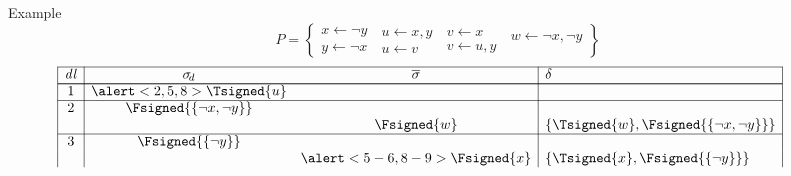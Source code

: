 \begin{frame}[shrink=0]{Example}
  \[
    P
    =
    \left\{
    \begin{array}{l}
      x  \leftarrow  \neg y \\
      y  \leftarrow  \neg x
    \end{array}
    \
    \begin{array}{l}
      u  \leftarrow x,y \\
      u  \leftarrow v
    \end{array}
    \
    \begin{array}{l}
      v  \leftarrow x \\
      v  \leftarrow u,y
    \end{array}
    \
    \begin{array}{l}
      w  \leftarrow \neg x,\neg y \\
      \mbox{~}
    \end{array}
    \right\}
  \]
  \medskip\footnotesize
  \[
    \begin{array}{|c|cc|l|p{5pt}l}
      \cline{1-4}
      \mathit{dl} & \sigma_{\!d}                               & \overline{\sigma}                & \delta                                                                                            &            &
      \\\cline{1-4}\cline{1-4}
      1           & \alert<2,5,8>{\Tsigned{u}                } &                                  &                                                                                                   &            &
      \\\cline{1-4}
      2           & \Fsigned{\{\neg x,\neg y\}}                &                                  &                                                                                                   &            &
      \\
                  &                                            & \Fsigned{w}                      & \{\Tsigned{w},\Fsigned{\{\neg x,\neg y\}}\}                                                       &            &
      \\\cline{1-4}
      3           & \Fsigned{\{\neg y\}}                       &                                  &                                                                                                   &            &
      \\
                  &                                            & \alert<5-6,8-9>{\Fsigned{x}}     & \{\Tsigned{x},\Fsigned{\{\neg y\}}\}                                                              &            &

\end{array}\]
\end{frame}
